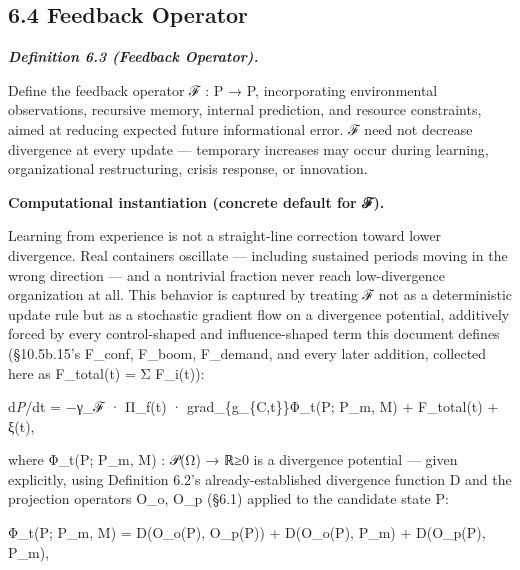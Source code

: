 \documentclass[
]{article}
\begin{document}
\hypertarget{feedback-operator}{%
\subsection{6.4 Feedback Operator}\label{feedback-operator}}

\emph{\textbf{Definition 6.3 (Feedback Operator).}}

Define the feedback operator ℱ : P → P, incorporating environmental
observations, recursive memory, internal prediction, and resource
constraints, aimed at reducing expected future informational error. ℱ
need not decrease divergence at every update --- temporary increases may
occur during learning, organizational restructuring, crisis response, or
innovation.

\textbf{Computational instantiation (concrete default for ℱ).}

Learning from experience is not a straight-line correction toward lower
divergence. Real containers oscillate --- including sustained periods
moving in the wrong direction --- and a nontrivial fraction never reach
low-divergence organization at all. This behavior is captured by
treating ℱ not as a deterministic update rule but as a stochastic
gradient flow on a divergence potential, additively forced by every
control-shaped and influence-shaped term this document defines
(§10.5b.15's F\_conf, F\_boom, F\_demand, and every later addition,
collected here as F\_total(t) = Σ F\_i(t)):

d\emph{P}/dt = −γ\_ℱ · Π\_f(t) · grad\_\{g\_\{C,t\}\}Φ\_t(P; P\_m, M) +
F\_total(t) + ξ(t),

where Φ\_t(P; P\_m, M) : 𝒫(Ω) → ℝ≥0 is a divergence potential --- given
explicitly, using Definition 6.2's already-established divergence
function D and the projection operators O\_o, O\_p (§6.1) applied to the
candidate state P:

Φ\_t(P; P\_m, M) = D(O\_o(P), O\_p(P)) + D(O\_o(P), P\_m) + D(O\_p(P),
P\_m),
\end{document}
